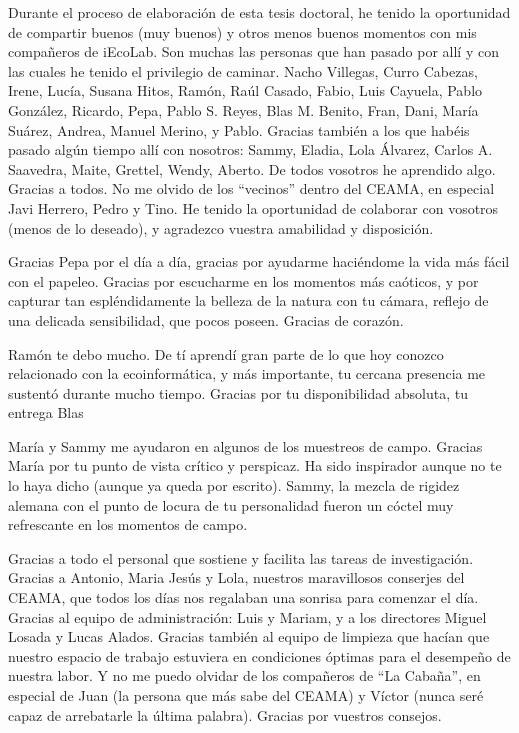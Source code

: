 Durante el proceso de elaboración de esta tesis doctoral, he tenido la oportunidad de compartir buenos (muy buenos) y otros menos buenos momentos con mis compañeros de iEcoLab. Son muchas las personas que han pasado por allí y con las cuales he tenido el privilegio de caminar. Nacho Villegas, Curro Cabezas, Irene, Lucía, Susana Hitos, Ramón, Raúl Casado, Fabio, Luis Cayuela, Pablo González, Ricardo, Pepa, Pablo S. Reyes, Blas M. Benito, Fran, Dani, María Suárez, Andrea, Manuel Merino, y Pablo. Gracias también a los que habéis pasado algún tiempo allí con nosotros: Sammy, Eladia, Lola Álvarez, Carlos A. Saavedra, Maite, Grettel, Wendy, Aberto. De todos vosotros he aprendido algo. Gracias a todos. No me olvido de los “vecinos” dentro del CEAMA, en especial Javi Herrero, Pedro y Tino. He tenido la oportunidad de colaborar con vosotros (menos de lo deseado), y agradezco vuestra amabilidad y disposición. 

Gracias Pepa por el día a día, gracias por ayudarme haciéndome la vida más fácil con el papeleo. Gracias por escucharme en los momentos más caóticos, y por capturar tan espléndidamente la belleza de la natura con tu cámara, reflejo de una delicada sensibilidad, que pocos poseen. Gracias de corazón. 

Ramón te debo mucho. De tí aprendí gran parte de lo que hoy conozco relacionado con la ecoinformática, y más importante, tu cercana presencia me sustentó durante mucho tiempo. Gracias por tu disponibilidad absoluta, tu entrega 
Blas 

María y Sammy me ayudaron en algunos de los muestreos de campo. Gracias María por tu punto de vista crítico y perspicaz. Ha sido inspirador aunque no te lo haya dicho (aunque ya queda por escrito). Sammy, la mezcla de rigidez alemana con el punto de locura de tu personalidad fueron un cóctel muy refrescante en los momentos de campo. 

Gracias a todo el personal que sostiene y facilita las tareas de investigación. Gracias a Antonio, Maria Jesús y Lola, nuestros maravillosos conserjes del CEAMA, que todos los días nos regalaban una sonrisa para comenzar el día. Gracias al equipo de administración: Luis y Mariam, y a los directores Miguel Losada y Lucas Alados. Gracias también al equipo de limpieza que hacían que nuestro espacio de trabajo estuviera en condiciones óptimas para el desempeño de nuestra labor. Y no me puedo olvidar de los compañeros de “La Cabaña”, en especial de Juan (la persona que más sabe del CEAMA) y Víctor (nunca seré capaz de arrebatarle la última palabra). Gracias por vuestros consejos. 

